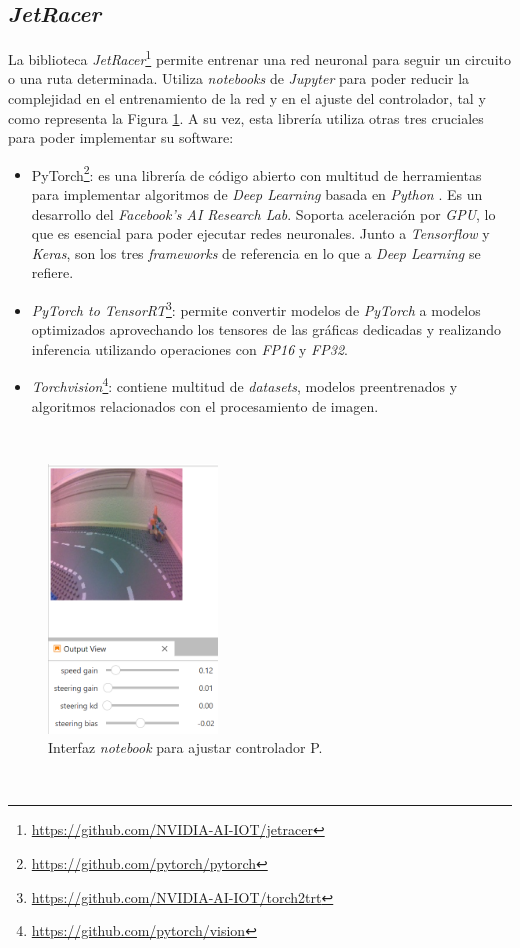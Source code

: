 \subsection{\textit{JetRacer}}
\label{subsection:jetracer}
La biblioteca \textit{JetRacer}\footnote{\url{https://github.com/NVIDIA-AI-IOT/jetracer}} permite entrenar una red neuronal para seguir un circuito o una ruta determinada. Utiliza \textit{notebooks} de \textit{Jupyter} para poder reducir la complejidad en el entrenamiento de la red y en el ajuste del controlador, tal y como representa la Figura \ref{fig:livejetracer}. A su vez, esta librería utiliza otras tres cruciales para poder implementar su software:
\begin{itemize}
	\item PyTorch\footnote{\url{https://github.com/pytorch/pytorch}}: es una librería de código abierto con multitud de herramientas para implementar algoritmos de \textit{Deep Learning} basada en \textit{Python} \cite{autopilottesla}. Es un desarrollo del \textit{Facebook's AI Research Lab}. Soporta aceleración por \textit{GPU}, lo que es esencial para poder ejecutar redes neuronales. Junto a \textit{Tensorflow} y \textit{Keras}, son los tres \textit{frameworks} de referencia en lo que a \textit{Deep Learning} se refiere.
	\item \textit{PyTorch to TensorRT}\footnote{\url{https://github.com/NVIDIA-AI-IOT/torch2trt}}: permite convertir modelos de \textit{PyTorch} a modelos optimizados aprovechando los tensores de las gráficas dedicadas y realizando inferencia utilizando operaciones con \textit{FP16} y \textit{FP32}.
	\item \textit{Torchvision}\footnote{\url{https://github.com/pytorch/vision}}: contiene multitud de \textit{datasets}, modelos preentrenados y algoritmos relacionados con el procesamiento de imagen.
\end{itemize}\
\begin{figure} [h!]
	\begin{center}
		\includegraphics[width=4.5cm]{figs/livejetracer}
	\end{center}
	\caption{Interfaz \textit{notebook} para ajustar controlador P.}
	\label{fig:livejetracer}
\end{figure}\
